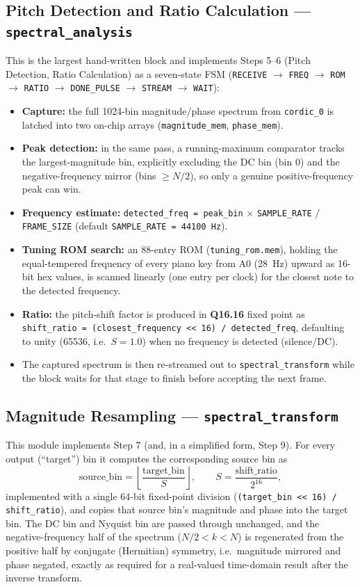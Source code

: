 \documentclass[conference,a4paper]{IEEEtran}
\begin{document}
\subsection{Pitch Detection and Ratio Calculation --- \texttt{spectral\_analysis}}
This is the largest hand-written block and implements Steps 5--6 (Pitch Detection, Ratio
Calculation) as a seven-state FSM (\texttt{RECEIVE} $\to$ \texttt{FREQ} $\to$ \texttt{ROM}
$\to$ \texttt{RATIO} $\to$ \texttt{DONE\_PULSE} $\to$ \texttt{STREAM} $\to$ \texttt{WAIT}):
\begin{itemize}
    \item \textbf{Capture:} the full 1024-bin magnitude/phase spectrum from \texttt{cordic\_0}
    is latched into two on-chip arrays (\texttt{magnitude\_mem}, \texttt{phase\_mem}).
    \item \textbf{Peak detection:} in the same pass, a running-maximum comparator tracks the
    largest-magnitude bin, explicitly excluding the DC bin (bin 0) and the
    negative-frequency mirror (bins $\geq N/2$), so only a genuine positive-frequency peak
    can win.
    \item \textbf{Frequency estimate:} \texttt{detected\_freq = peak\_bin} $\times$
    \texttt{SAMPLE\_RATE} $/$ \texttt{FRAME\_SIZE} (default \texttt{SAMPLE\_RATE = 44100~Hz}).
    \item \textbf{Tuning ROM search:} an 88-entry ROM (\texttt{tuning\_rom.mem}), holding the
    equal-tempered frequency of every piano key from A0 (28~Hz) upward as 16-bit hex values,
    is scanned linearly (one entry per clock) for the closest note to the detected frequency.
    \item \textbf{Ratio:} the pitch-shift factor is produced in \textbf{Q16.16} fixed point as
    \texttt{shift\_ratio = (closest\_frequency << 16) / detected\_freq}, defaulting to unity
    (65536, i.e.\ $S=1.0$) when no frequency is detected (silence/DC).
    \item The captured spectrum is then re-streamed out to \texttt{spectral\_transform} while
    the block waits for that stage to finish before accepting the next frame.
\end{itemize}

\subsection{Magnitude Resampling --- \texttt{spectral\_transform}}
This module implements Step 7 (and, in a simplified form, Step 9). For every output
(``target'') bin it computes the corresponding source bin as
\[
    \text{source\_bin} = \left\lfloor \frac{\text{target\_bin}}{S} \right\rfloor,
    \qquad S = \frac{\text{shift\_ratio}}{2^{16}},
\]
implemented with a single 64-bit fixed-point division
(\texttt{(target\_bin << 16) / shift\_ratio}), and copies that source bin's magnitude and
phase into the target bin. The DC bin and Nyquist bin are passed through unchanged, and the
negative-frequency half of the spectrum ($N/2 < k < N$) is regenerated from the positive
half by conjugate (Hermitian) symmetry, i.e.\ magnitude mirrored and phase negated, exactly
as required for a real-valued time-domain result after the inverse transform.
\end{document}
